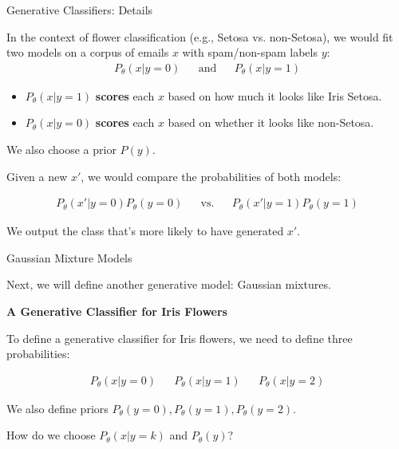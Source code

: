 \documentclass[../../main.tex]{subfiles}
\begin{document}
\begin{frame}[fragile]{Generative Classifiers: Details}

In the context of flower classification (e.g., Setosa vs. non-Setosa), we would fit two models on a corpus of emails $x$ with spam/non-spam labels $y$:
\begin{align*}
P_\theta(x|y=\text{0}) && \text{and} && P_\theta(x|y=\text{1})
\end{align*}

\begin{itemize}
    \item $P_\theta(x | y=1)$ \textbf{scores} each $x$ based on how much it looks like Iris Setosa.
    \item $P_\theta(x | y=0)$ \textbf{scores} each $x$ based on whether it looks like non-Setosa.
\end{itemize}
We also choose a prior $P(y)$.

Given a new $x'$, we would compare the probabilities of both models:

\begin{align*}
P_\theta(x'|y=\text{0})P_\theta(y=\text{0}) && \text{vs.} && P_\theta(x'|y=\text{1})P_\theta(y=\text{1})
\end{align*}

We output the class that's more likely to have generated $x'$.
\end{frame}

\begin{frame}[fragile]{Gaussian Mixture Models}

Next, we will define another generative model: Gaussian mixtures.

\vspace{0.3cm}

\textbf{A Generative Classifier for Iris Flowers}

To define a generative classifier for Iris flowers, we need to define three probabilities:

\begin{align*}
P_\theta(x|y=\text{0}) && P_\theta(x|y=\text{1}) && P_\theta(x|y=\text{2})
\end{align*}

We also define priors $P_\theta(y=\text{0}), P_\theta(y=\text{1}), P_\theta(y=\text{2})$.

How do we choose $P_\theta(x|y=k)$ and $P_\theta(y)$?

\end{frame}
\end{document}
